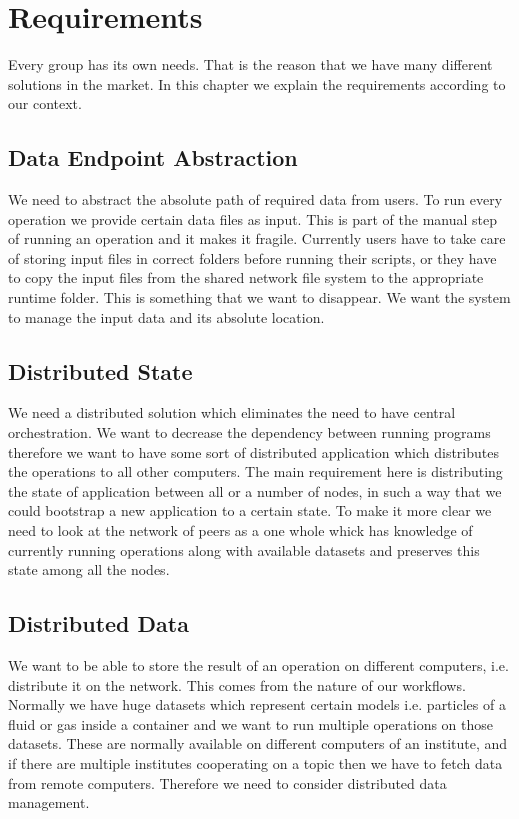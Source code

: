 \chapter{Requirements}
\label{cha:requirements}

Every group has its own needs. That is the reason that we have many different solutions in the market.
In this chapter we explain the requirements according to our context.


\section{Data Endpoint Abstraction}
We need to abstract the absolute path of required data from users. To run every operation
we provide certain data files as input. This is part of the manual step of running an operation and
it makes it fragile. Currently users have to take care of storing input files in correct folders before
running their scripts, or they have to copy the input files from the shared network file system to the
appropriate runtime folder. This is something that we want to disappear. We want the system to 
manage the input data and its absolute location.

\section{Distributed State}
We need a distributed solution which eliminates the need to have central orchestration.
We want to decrease the dependency between running programs therefore we want to have 
some sort of distributed application which distributes the operations to all other computers.
The main requirement here is distributing the state of application between all or a number of nodes, 
in such a way that we could bootstrap a new application to a certain state. To make it more clear
we need to look at the network of peers as a one whole whick has knowledge of currently running
operations along with available datasets and preserves this state among all the nodes.

\section{Distributed Data}
We want to be able to store the result of an operation on different computers, i.e. distribute it on the network.
This comes from the nature of our workflows. Normally we have huge datasets which represent certain models i.e.
particles of a fluid or gas inside a container and we want to run multiple operations on those datasets. These
are normally available on different computers of an institute, and if there are multiple institutes cooperating
on a topic then we have to fetch data from remote computers. Therefore we need to consider distributed data management.

